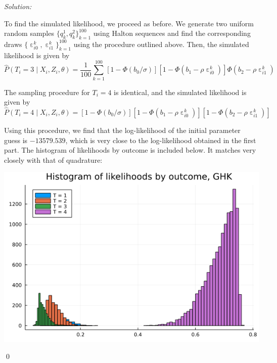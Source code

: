 \documentclass[12pt]{article}
\DeclareMathOperator{\eps}{\varepsilon}
\newenvironment{problem}[2][Problem]{\begin{trivlist}
\item[\hskip \labelsep {\bfseries #1}\hskip \labelsep {\bfseries #2.}]}{\end{trivlist}}
\newenvironment{sol}
    {\emph{Solution:}
    }
    {
    \qed
    }
\begin{document}
\begin{sol}
    To find the simulated likelihood, we proceed as before. We generate two uniform random samples $\{q_k^1, q_k^2\}_{k=1}^{100}$ using Halton sequences and find the corresponding draws $\{\eps_{i0}^k, \eps_{i1}^k\}_{k=1}^{100}$ using the procedure outlined above. Then, the simulated likelihood is given by
    \[\hat{P}(T_i = 3 \mid X_i, Z_i, \theta) = \frac{1}{100} \sum_{k=1}^{100} [1-\Phi(b_0/\sigma)] [1 - \Phi(b_1 - \rho \eps_{i0}^k)] \Phi(b_2 - \rho \eps_{i1}^k)\]

    The sampling procedure for $T_i = 4$ is identical, and the simulated likelihood is given by
    \[\hat{P}(T_i = 4 \mid X_i, Z_i, \theta) =[1-\Phi(b_0/\sigma)] [1 - \Phi(b_1 - \rho \eps_{i0}^k)] [1 -\Phi(b_2 - \rho \eps_{i1}^k)]\]

    Using this procedure, we find that the log-likelihood of the initial parameter guess is $-13579.539$, which is very close to the log-likelihood obtained in the first part. The histogram of likelihoods by outcome is included below. It matches very closely with that of quadrature:
    \begin{center}
        \includegraphics[scale=0.5]{GHK_ll.png}
    \end{center}
\end{sol}
\begin{problem}{3}
\end{problem}
\end{document}
